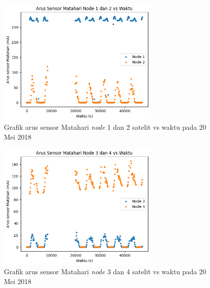 \begin{figure}[H]
\setlength{}
\begin{center}
\includegraphics[width=0.7\textwidth]{fig/raw_node12_css_2018-05-20.png}
	\caption{Grafik arus sensor Matahari \textit{node} 1 dan 2 satelit vs waktu pada 20 Mei 2018}
\label{fig:rawcss1220}
\end{center}
\end{figure}

\begin{figure}[H]
\setlength{}
\begin{center}
\includegraphics[width=0.7\textwidth]{fig/raw_node34_css_2018-05-20.png}
	\caption{Grafik arus sensor Matahari \textit{node} 3 dan 4 satelit vs waktu pada 20 Mei 2018}
\label{fig:rawcss3420}
\end{center}
\end{figure}

